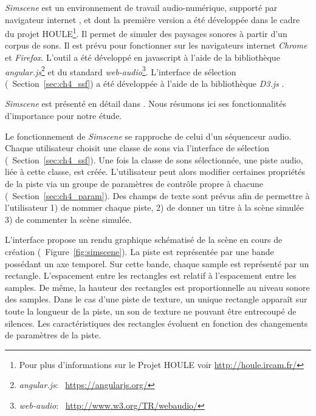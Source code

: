\emph{Simscene} est un environnement de travail audio-numérique, supporté par navigateur internet , et dont la première version a été développée dans le cadre du projet HOULE\footnote{Pour plus d’informations sur le Projet HOULE voir \url{http://houle.ircam.fr/}}. Il permet de simuler des paysages sonores à partir d'un corpus de sons. Il est prévu pour fonctionner sur les navigateurs internet \emph{Chrome} et \emph{Firefox}.  L'outil a été développé en javascript à l'aide de la bibliothèque \emph{angular.js}\footnote{\emph{angular.js}: \cf~\url{https://angularjs.org/}} et du standard \emph{web-audio}\footnote{\emph{web-audio}: \cf~\url{http://www.w3.org/TR/webaudio/}}. L'interface de sélection (\cf~Section~\ref{sec:ch4_ssf}) a été développée à l'aide de la bibliothèque \emph{D3.js} \citep{d32011}.

\emph{Simscene} est présenté en détail dans \citep{rossignol2015simscene}. Nous résumons ici ses fonctionnalités d'importance pour notre étude. 

Le fonctionnement de \emph{Simscene} se rapproche de celui d'un séquenceur audio. Chaque utilisateur choisit une classe de sons via l'interface de sélection (\cf~Section~\ref{sec:ch4_ssf}). Une fois la classe de sons sélectionnée, une piste audio, liée à cette classe, est créée. L'utilisateur peut alors modifier certaines propriétés de la piste via un groupe de paramètres de contrôle propre à chacune (\cf~Section~\ref{sec:ch4_param}). Des champs de texte sont prévus afin de permettre à l'utilisateur 1) de nommer chaque piste, 2) de donner un titre à la scène simulée 3) de commenter la scène simulée.

L'interface propose un rendu graphique schématisé de la scène en cours de création (\cf~Figure~\ref{fig:simscene}). La piste est représentée par une bande possédant un axe temporel. Sur cette bande, chaque sample est représenté par un rectangle. L'espacement entre les rectangles est relatif à l'espacement entre les samples. De même, la hauteur des rectangles est proportionnelle au niveau sonore des samples. Dans le cas d'une piste de texture, un unique rectangle apparaît sur toute la longueur de la piste, un son de texture ne pouvant être entrecoupé de silences. Les caractéristiques des rectangles évoluent en fonction des changements de paramètres de la piste.

